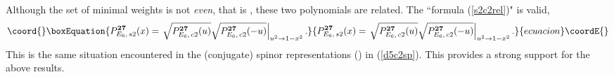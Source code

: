 \documentclass[a4paper,12pt]{article}
\providecommand{\vTb}{\vphantom{\mbox{\larl I}}}
\begin{document}
Although the set of minimal weights \coordHE{} is not {\em even\/}, that is
\coordHE{}, these two polynomials are related.
The ``formula (\ref{s2c2rel})" is valid,
\begin{equation}\coord{}\boxEquation{
   P_{E_6,\,s2}^{\bf 27}(x)
   =\left.\vTb \sqrt{P_{E_6,\,c2}^{\bf 27}(u)}
   \sqrt{P_{E_6,\,c2}^{\bf 27}(-u)}\right|_{u^2\to1-x^2}.
}{
   P_{E_6,\,s2}^{\bf 27}(x)
   =\left.\vTb \sqrt{P_{E_6,\,c2}^{\bf 27}(u)}
   \sqrt{P_{E_6,\,c2}^{\bf 27}(-u)}\right|_{u^2\to1-x^2}.
}{ecuacion}\coordE{}\end{equation}
This is the same situation encountered in the \coordHE{} (conjugate) spinor
representations \coordHE{} (\coordHE{}) in (\ref{d5c2sp}).
This provides a strong support for the above results.
\end{document}

